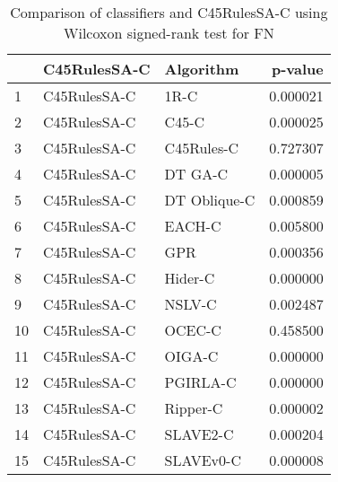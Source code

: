 \begin{table}
\footnotesize
\caption{Comparison of classifiers and C45RulesSA-C using Wilcoxon signed-rank test for FN}
\label{tab:C45RulesSA-C wilcoxon FN comparison}
\begin{tabular}{lllr}
\hline
 & C45RulesSA-C & Algorithm & p-value \\
\hline
1 & C45RulesSA-C & 1R-C & 0.000021 \\
2 & C45RulesSA-C & C45-C & 0.000025 \\
3 & C45RulesSA-C & C45Rules-C & 0.727307 \\
4 & C45RulesSA-C & DT GA-C & 0.000005 \\
5 & C45RulesSA-C & DT Oblique-C & 0.000859 \\
6 & C45RulesSA-C & EACH-C & 0.005800 \\
7 & C45RulesSA-C & GPR & 0.000356 \\
8 & C45RulesSA-C & Hider-C & 0.000000 \\
9 & C45RulesSA-C & NSLV-C & 0.002487 \\
10 & C45RulesSA-C & OCEC-C & 0.458500 \\
11 & C45RulesSA-C & OIGA-C & 0.000000 \\
12 & C45RulesSA-C & PGIRLA-C & 0.000000 \\
13 & C45RulesSA-C & Ripper-C & 0.000002 \\
14 & C45RulesSA-C & SLAVE2-C & 0.000204 \\
15 & C45RulesSA-C & SLAVEv0-C & 0.000008 \\
\hline
\end{tabular}
\end{table}
